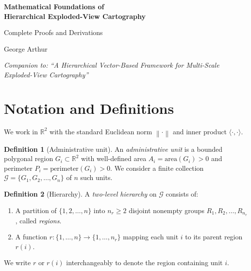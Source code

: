 \documentclass[12pt, a4paper]{article}
\numberwithin{equation}{section}
\theoremstyle{definition}
\newtheorem{definition}{Definition}[section]
\theoremstyle{plain}
\theoremstyle{remark}
\newcommand{\R}{\mathbb{R}}
\newcommand{\norm}[1]{\left\|#1\right\|}
\newcommand{\inner}[2]{\langle #1, #2 \rangle}
\begin{document}
\begin{center}
{\LARGE\bfseries Mathematical Foundations of\\[4pt]
Hierarchical Exploded-View Cartography}

\bigskip
{\large Complete Proofs and Derivations}

\bigskip
George Arthur

\medskip
{\small\itshape Companion to: ``A Hierarchical Vector-Based Framework for Multi-Scale Exploded-View Cartography''}
\end{center}

\bigskip

\begin{abstract}
This document provides a self-contained mathematical treatment of the hierarchical centroid-driven displacement framework for exploded-view cartography. Every variable is defined precisely, every proposition is proved from first principles, and the two analytical parameter-derivation results are derived step by step. The presentation assumes familiarity with Euclidean geometry, basic vector algebra, and elementary calculus (derivatives and gradients). No knowledge of cartography or GIS is required.
\end{abstract}

\tableofcontents
\newpage


\section{Notation and Definitions}
\label{sec:notation}

We work in $\R^2$ with the standard Euclidean norm $\norm{\cdot}$ and inner product $\inner{\cdot}{\cdot}$.

\begin{definition}[Administrative unit]
An \emph{administrative unit} is a bounded polygonal region $G_i \subset \R^2$ with well-defined area $A_i = \mathrm{area}(G_i) > 0$ and perimeter $P_i = \mathrm{perimeter}(G_i) > 0$. We consider a finite collection $\mathcal{G} = \{G_1, G_2, \ldots, G_n\}$ of $n$ such units.
\end{definition}

\begin{definition}[Hierarchy]
A \emph{two-level hierarchy} on $\mathcal{G}$ consists of:
\begin{enumerate}[label=(\roman*)]
  \item A partition of $\{1, 2, \ldots, n\}$ into $n_r \geq 2$ disjoint nonempty groups $R_1, R_2, \ldots, R_{n_r}$, called \emph{regions}.
  \item A function $r: \{1, \ldots, n\} \to \{1, \ldots, n_r\}$ mapping each unit $i$ to its parent region $r(i)$.
\end{enumerate}
We write $r$ or $r(i)$ interchangeably to denote the region containing unit $i$.
\end{definition}
\end{document}

